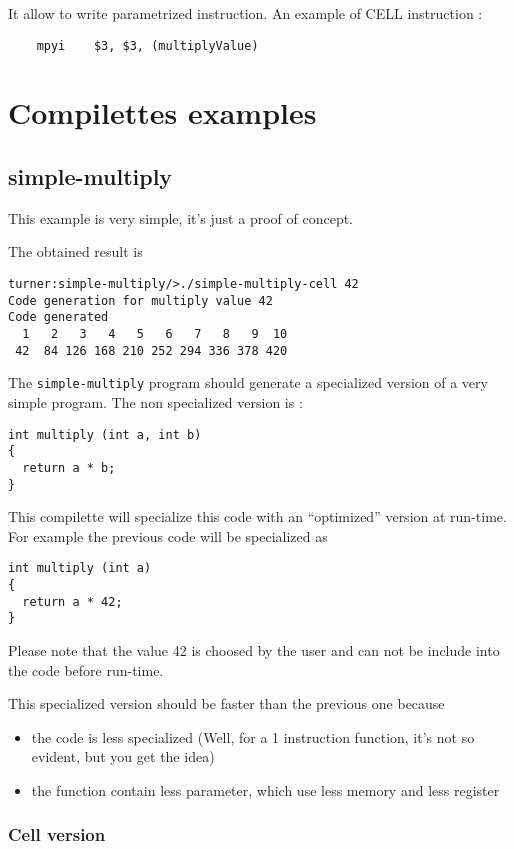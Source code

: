 \documentclass{article}
\begin{document}
It allow to write parametrized instruction. An example of CELL
instruction :
\begin{verbatim}
	mpyi    $3, $3, (multiplyValue) 
\end{verbatim}

\section{Compilettes examples}

\subsection{simple-multiply}

This example is very simple, it's just a proof of concept.

The obtained result is
\begin{verbatim}
turner:simple-multiply/>./simple-multiply-cell 42
Code generation for multiply value 42
Code generated
  1   2   3   4   5   6   7   8   9  10 
 42  84 126 168 210 252 294 336 378 420 
\end{verbatim}

The \texttt{simple-multiply} program should generate a specialized
version of a very simple program. The non specialized version is :
\begin{verbatim}
int multiply (int a, int b)
{
  return a * b;
}
\end{verbatim}

This compilette will specialize this code with an ``optimized''
version at run-time. For example the previous code will be specialized
as
\begin{verbatim}
int multiply (int a)
{
  return a * 42;
}
\end{verbatim}

Please note that the value 42 is choosed by the user and can not be
include into the code before run-time.

This specialized version should be faster than the previous one because
\begin{itemize}
\item the code is less specialized (Well, for a 1 instruction
  function, it's not so evident, but you get the idea)
\item the function contain less parameter, which use less memory and
  less register
\end{itemize}


\subsubsection{Cell version}
\end{document}
